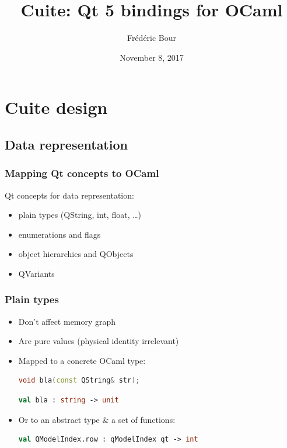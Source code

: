 \documentclass[serif,mathserif]{beamer}
\author{Frédéric Bour}
\title[Cuite\hspace{2em}\insertframenumber/\inserttotalframenumber]{Cuite: Qt 5 bindings for OCaml}
\date{November 8, 2017}
\begin{document}
\maketitle



\section{Cuite design}

\subsection{Data representation}

\begin{frame}
  \frametitle{Mapping Qt concepts to OCaml}

  Qt concepts for data representation:
  \begin{itemize}
    \item plain types (QString, int, float, \ldots)
    \item enumerations and flags
    \item object hierarchies and QObjects
    \item QVariants
  \end{itemize}
\end{frame}

\begin{frame}[fragile]
  \frametitle{Plain types}

  \begin{itemize}
    \item Don't affect memory graph
    \item Are pure values (physical identity irrelevant)
    \item Mapped to a concrete OCaml type: \\
      \begin{lstlisting}[language=C++]
        void bla(const QString& str);
      \end{lstlisting}
      \vspace{-0.4cm}
      \begin{lstlisting}[language=Caml,morekeywords={val}]
        val bla : string -> unit
      \end{lstlisting}

    \item Or to an abstract type \& a set of functions:
      \begin{lstlisting}[language=Caml,morekeywords={val}]
        val QModelIndex.row : qModelIndex qt -> int
      \end{lstlisting}
  \end{itemize}

\end{frame}
\end{document}
